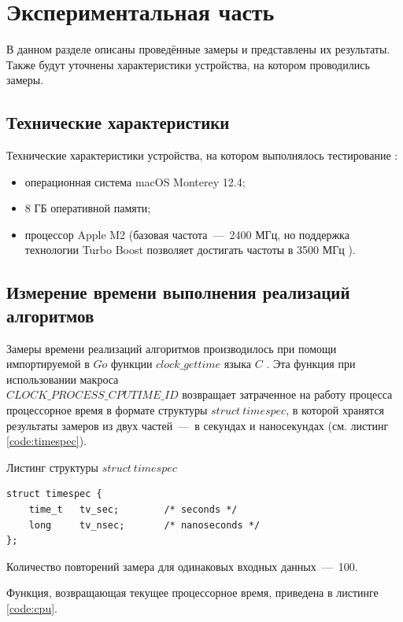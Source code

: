 \chapter{Экспериментальная часть}

В данном разделе описаны проведённые замеры и представлены их результаты. Также будут уточнены характеристики устройства, на котором проводились замеры.

\section{Технические характеристики}
Технические характеристики устройства, на котором выполнялось тестирование \cite{web_item5}:
\begin{itemize}
	\item операционная система macOS Monterey 12.4;
	\item 8 ГБ оперативной памяти;
	\item процессор Apple M2 (базовая частота~---~2400 МГц, но поддержка технологии Turbo Boost позволяет достигать частоты в 3500 МГц \cite{web_item10}).
\end{itemize}

\section{Измерение времени выполнения реализаций алгоритмов}
Замеры времени реализаций алгоритмов производилось при помощи импортируемой в $Go$ функции $clock\_gettime$ языка $C$ \cite{web_item12}. Эта функция при использовании макроса \\ $CLOCK\_PROCESS\_CPUTIME\_ID$ возвращает затраченное на работу процесса процессорное время в формате структуры $struct\ timespec$, в которой хранятся результаты замеров из двух частей~---~в секундах и наносекундах (см. листинг \ref{code:timespec}).

\begin{code}
\caption{Листинг структуры $struct\ timespec$}
\label{code:timespec}

\begin{verbatim}
struct timespec {
	time_t   tv_sec;        /* seconds */
	long     tv_nsec;       /* nanoseconds */
};
\end{verbatim}
\end{code}

Количество повторений замера для одинаковых входных данных~---~100.

\newpage

Функция, возвращающая текущее процессорное время, приведена в листинге \ref{code:cpu}.

